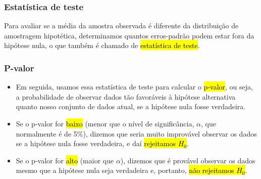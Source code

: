 \begin{frame}
\frametitle{Estatística de teste}
\justifying
Para avaliar se a média da amostra observada é diferente da distribuição de amostragem hipotética, determinamos quantos erros-padrão podem estar fora da hipótese nula, o que também é chamado de \hl{estatística de teste}.


\pause

{
\pause
\justifying
\tiny{
\pause
\justifying
{}
}}

\end{frame}


\begin{frame}
\frametitle{P-valor}

\begin{itemize}
\justifying
\item Em seguida, usamos essa estatística de teste para calcular o \hl{p-valor}, ou seja, a probabilidade de observar dados tão favoráveis à hipótese alternativa quanto nosso conjunto de dados atual, se a hipótese nula fosse verdadeira.


\pause
\justifying
\item Se o p-valor for \hl{baixo} (menor que o nível de significância, $\alpha$, que normalmente é de 5\%), dizemos que seria muito improvável observar os dados se a hipótese nula fosse verdadeira, e daí \hl{rejeitamos $H_0$}.

\pause
\justifying
\item Se o p-valor for \hl{alto} (maior que $\alpha$), dizemos que é provável observar os dados mesmo que a hipótese nula seja verdadeira e, portanto, \hl{não rejeitamos $H_0$}.

\end{itemize}

\end{frame}

